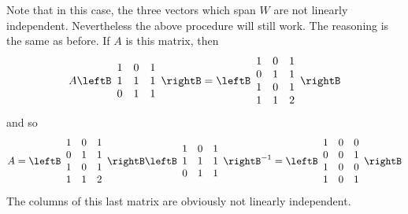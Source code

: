 \begin{solution}
Note that in this case, the three vectors which span $W$ are not linearly independent. Nevertheless the above procedure will still work.
The reasoning is the same as before. If $A$ is this matrix, then 
\begin{equation*}
A\leftB
\begin{array}{rrr}
1 & 0 & 1 \\ 
1 & 1 & 1 \\ 
0 & 1 & 1
\end{array}
\rightB =\leftB 
\begin{array}{rrr}
1 & 0 & 1 \\ 
0 & 1 & 1 \\ 
1 & 0 & 1 \\ 
1 & 1 & 2
\end{array}
\rightB
\end{equation*}
and so 
\begin{equation*}
A=\leftB
\begin{array}{rrr}
1 & 0 & 1 \\ 
0 & 1 & 1 \\ 
1 & 0 & 1 \\ 
1 & 1 & 2
\end{array}
\rightB \leftB 
\begin{array}{rrr}
1 & 0 & 1 \\ 
1 & 1 & 1 \\ 
0 & 1 & 1
\end{array}
\rightB ^{-1}=\leftB 
\begin{array}{rrr}
1 & 0 & 0 \\ 
0 & 0 & 1 \\ 
1 & 0 & 0 \\ 
1 & 0 & 1
\end{array}
\rightB
\end{equation*}
The columns of this last matrix are obviously not linearly independent.
\end{solution}
